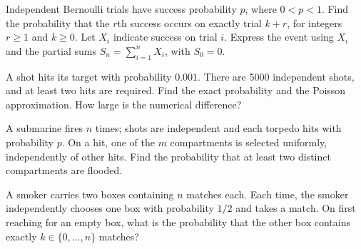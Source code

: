 \begin{problem}
Independent Bernoulli trials have success probability $p$, where $0<p<1$.
Find the probability that the $r$th success occurs on exactly trial $k+r$, for
integers $r\ge1$ and $k\ge0$. Let $X_i$ indicate success on trial $i$. Express
the event using $X_i$ and the partial sums $S_n=\sum_{i=1}^nX_i$, with $S_0=0$.
\end{problem}
\begin{problem}
A shot hits its target with probability $0.001$. There are 5000 independent shots,
and at least two hits are required. Find the exact probability and the Poisson
approximation. How large is the numerical difference?
\end{problem}
\begin{problem}
A submarine fires $n$ times; shots are independent and each torpedo hits with
probability $p$. On a hit, one of the $m$ compartments is selected uniformly,
independently of other hits. Find the probability that at least two distinct compartments are flooded.
\end{problem}
\begin{problem}
A smoker carries two boxes containing $n$ matches each. Each time, the smoker
independently chooses one box with probability $1/2$ and takes a match.
On first reaching for an empty box, what is the probability that the other box
contains exactly $k\in\{0,\dots,n\}$ matches?
\end{problem}
